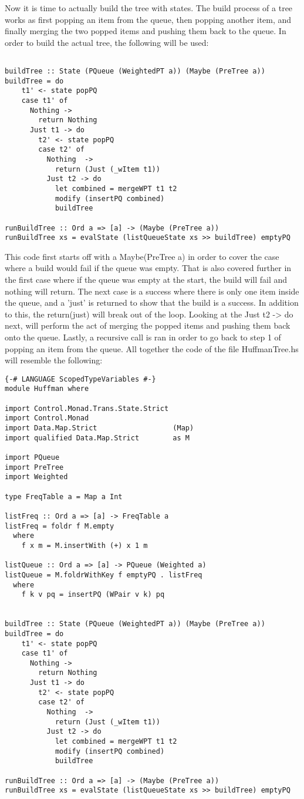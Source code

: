 \documentclass{article}
\begin{document}
Now it is time to actually build the tree with states.
The build process of a tree works as first popping an item from the queue, then popping another item, and finally merging the two popped items and pushing them back to the queue.
In order to build the actual tree, the following will be used:
\begin{lstlisting}

buildTree :: State (PQueue (WeightedPT a)) (Maybe (PreTree a))
buildTree = do
    t1' <- state popPQ
    case t1' of
      Nothing ->
        return Nothing
      Just t1 -> do
        t2' <- state popPQ
        case t2' of
          Nothing  ->
            return (Just (_wItem t1))
          Just t2 -> do
            let combined = mergeWPT t1 t2
            modify (insertPQ combined)
            buildTree  

runBuildTree :: Ord a => [a] -> (Maybe (PreTree a))
runBuildTree xs = evalState (listQueueState xs >> buildTree) emptyPQ
\end{lstlisting}
This code first starts off with a Maybe(PreTree a) in order to cover the case where a build would fail if the queue was empty.
That is also covered further in the first case where if the queue was empty at the start, the build will fail and nothing will return.
The next case is a success where there is only one item inside the queue, and a 'just' is returned to show that the build is a success.
In addition to this, the return(just) will break out of the loop.
Looking at the Just t2 -> do next, will perform the act of merging the popped items and pushing them back onto the queue.
Lastly, a recursive call is ran in order to go back to step 1 of popping an item from the queue.
All together the code of the file HuffmanTree.hs will resemble the following:
\begin{lstlisting}
{-# LANGUAGE ScopedTypeVariables #-}
module Huffman where

import Control.Monad.Trans.State.Strict
import Control.Monad
import Data.Map.Strict                  (Map)
import qualified Data.Map.Strict        as M

import PQueue
import PreTree
import Weighted

type FreqTable a = Map a Int

listFreq :: Ord a => [a] -> FreqTable a
listFreq = foldr f M.empty
  where
    f x m = M.insertWith (+) x 1 m
    
listQueue :: Ord a => [a] -> PQueue (Weighted a)
listQueue = M.foldrWithKey f emptyPQ . listFreq
  where
    f k v pq = insertPQ (WPair v k) pq


buildTree :: State (PQueue (WeightedPT a)) (Maybe (PreTree a))
buildTree = do
    t1' <- state popPQ
    case t1' of
      Nothing ->
        return Nothing
      Just t1 -> do
        t2' <- state popPQ
        case t2' of
          Nothing  ->
            return (Just (_wItem t1))
          Just t2 -> do
            let combined = mergeWPT t1 t2
            modify (insertPQ combined)
            buildTree  

runBuildTree :: Ord a => [a] -> (Maybe (PreTree a))
runBuildTree xs = evalState (listQueueState xs >> buildTree) emptyPQ
\end{lstlisting}
\end{document}
